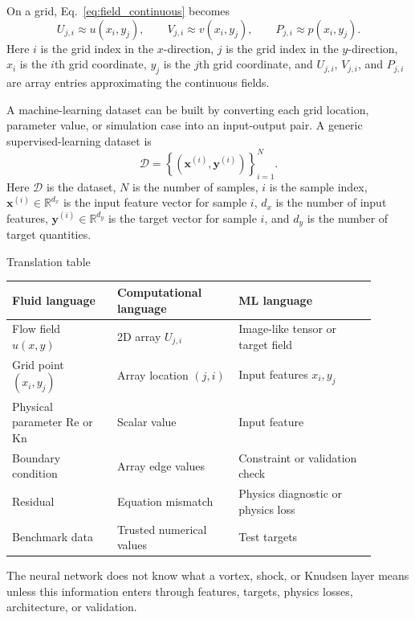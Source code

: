 \documentclass[11pt]{article}
\newcommand{\kn}{\mathrm{Kn}}
\newcommand{\re}{\mathrm{Re}}
\newcommand{\bx}{\bm{x}}
\newcommand{\by}{\bm{y}}
\begin{document}
On a grid, Eq.~\eqref{eq:field_continuous} becomes
\begin{equation}
    U_{j,i} \approx u(x_i,y_j), \qquad V_{j,i} \approx v(x_i,y_j), \qquad P_{j,i} \approx p(x_i,y_j).
    \label{eq:grid_field}
\end{equation}
Here $i$ is the grid index in the $x$-direction, $j$ is the grid index in the $y$-direction, $x_i$ is the $i$th grid coordinate, $y_j$ is the $j$th grid coordinate, and $U_{j,i}$, $V_{j,i}$, and $P_{j,i}$ are array entries approximating the continuous fields.

A machine-learning dataset can be built by converting each grid location, parameter value, or simulation case into an input-output pair.  A generic supervised-learning dataset is
\begin{equation}
    \mathcal{D}=\left\{\left(\bx^{(i)},\by^{(i)}\right)\right\}_{i=1}^{N}.
    \label{eq:dataset}
\end{equation}
Here $\mathcal{D}$ is the dataset, $N$ is the number of samples, $i$ is the sample index, $\bx^{(i)}\in\mathbb{R}^{d_x}$ is the input feature vector for sample $i$, $d_x$ is the number of input features, $\by^{(i)}\in\mathbb{R}^{d_y}$ is the target vector for sample $i$, and $d_y$ is the number of target quantities.

\begin{definitionbox}{Translation table}
\begin{center}
\begin{tabular}{p{0.26\linewidth}p{0.30\linewidth}p{0.34\linewidth}}
\toprule
Fluid language & Computational language & ML language \\
\midrule
Flow field $u(x,y)$ & 2D array $U_{j,i}$ & Image-like tensor or target field \\
Grid point $(x_i,y_j)$ & Array location $(j,i)$ & Input features $x_i,y_j$ \\
Physical parameter $\re$ or $\kn$ & Scalar value & Input feature \\
Boundary condition & Array edge values & Constraint or validation check \\
Residual & Equation mismatch & Physics diagnostic or physics loss \\
Benchmark data & Trusted numerical values & Test targets \\
\bottomrule
\end{tabular}
\end{center}
\end{definitionbox}

The neural network does not know what a vortex, shock, or Knudsen layer means unless this information enters through features, targets, physics losses, architecture, or validation.
\end{document}
